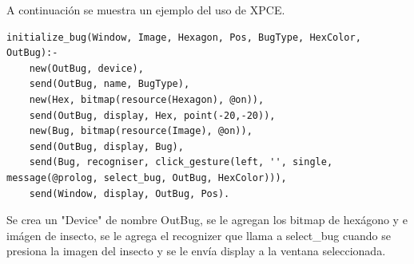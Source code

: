 \documentclass[a4paper,12pt]{article}
\begin{document}
A continuación se muestra un ejemplo del uso de XPCE.\\

\begin{lstlisting}
initialize_bug(Window, Image, Hexagon, Pos, BugType, HexColor, OutBug):-
	new(OutBug, device),
	send(OutBug, name, BugType),
	new(Hex, bitmap(resource(Hexagon), @on)),
	send(OutBug, display, Hex, point(-20,-20)),
	new(Bug, bitmap(resource(Image), @on)),
	send(OutBug, display, Bug),
	send(Bug, recogniser, click_gesture(left, '', single, message(@prolog, select_bug, OutBug, HexColor))),
	send(Window, display, OutBug, Pos).
\end{lstlisting}

Se crea un "Device" de nombre OutBug, se le agregan los bitmap de hexágono y e imágen de insecto, se le agrega el recognizer que llama a select\_bug cuando se presiona la imagen del insecto y se le envía display a la ventana seleccionada.
\end{document}

